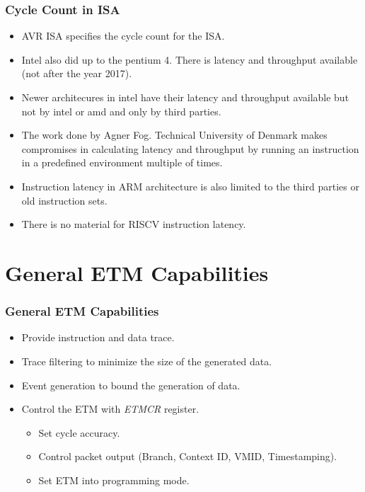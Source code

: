 \documentclass{beamer}
\begin{document}
\begin{frame}
    \frametitle{Cycle Count in ISA}
    \begin{itemize}
        \item AVR ISA specifies the cycle count for the ISA.
        \item Intel also did up to the pentium 4. There is latency and
            throughput available (not after the year 2017).
        \item Newer architecures in intel have their latency and throughput
            available but not by intel or amd and only by third parties.
        \item The work done by Agner Fog. Technical University of Denmark makes
            compromises in calculating latency and throughput by running an
            instruction in a predefined environment multiple of times.
        \item Instruction latency in ARM architecture is also limited to
            the third parties or old instruction sets.
        \item There is no material for RISCV instruction latency.
    \end{itemize}
\end{frame}

\section{General ETM Capabilities}
\begin{frame}
    \frametitle{General ETM Capabilities}
    \begin{itemize}
        \item Provide instruction and data trace.
        \item Trace filtering to minimize the size of the generated data.
        \item Event generation to bound the generation of data.
        \item Control the ETM with \textit{ETMCR} register.
            \begin{itemize}
                \item Set cycle accuracy.
                \item Control packet output (Branch, Context ID, VMID,
                    Timestamping).
                \item Set ETM into programming mode.
            \end{itemize}
    \end{itemize}
\end{frame}
\end{document}
